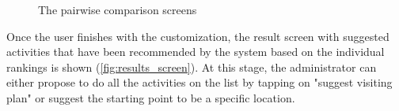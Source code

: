 \documentclass[11pt,a4paper,oneside]{article}
\begin{document}
\begin{figure}[H]
    \centering
    \qquad
    \qquad
    \caption{The pairwise comparison screens }%
    \label{fig:info_screens}%
\end{figure}

Once the user finishes with the customization, the result screen with suggested activities that have been recommended by the system based on the individual rankings is shown (\autoref{fig:results_screen}). At this stage, the administrator can either propose to do all the activities on the list by tapping on "suggest visiting plan" or suggest the starting point to be a specific location. 
\end{document}
